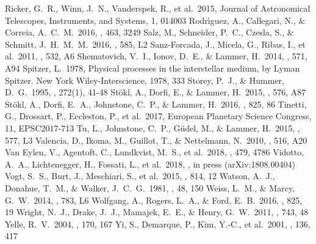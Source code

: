 \documentclass{aa}
\begin{document}
\begin{thebibliography}{}
    Ricker, G.~R., Winn, J.~N., Vanderspek, R., et al.\ 2015, Journal of Astronomical Telescopes, Instruments, and Systems, 1, 014003
    Rodr{\'{\i}}guez, A., Callegari, N., \& Correia, A.~C.~M.\ 2016, \mnras, 463, 3249
    Salz, M., Schneider, P.~C., Czesla, S., \& Schmitt, J.~H.~M.~M.\ 2016,          \aap, 585, L2
    Sanz-Forcada, J., Micela, G., Ribas, I., et al.\ 2011, \aap, 532, A6
    Shematovich, V.~I., Ionov, D.~E., \& Lammer, H.\ 2014, \aap, 571, A94
    Spitzer, L.\ 1978, Physical processes in the interstellar medium, by Lyman Spitzer. New York Wiley-Interscience, 1978, 333
     Storey, P.~J., \& Hummer, D.~G.\ 1995, \mnras, 272(1), 41-48
    St{\"o}kl, A., Dorfi, E., \& Lammer, H.\ 2015, \aap, 576, A87
    St{\"o}kl, A., Dorfi, E.~A., Johnstone, C.~P., \& Lammer, H.\ 2016, \apj, 825, 86
    Tinetti, G., Drossart, P., Eccleston, P., et al.\ 2017, European Planetary Science Congress, 11, EPSC2017-713
    Tu, L., Johnstone, C.~P., G{\"u}del, M., \& Lammer, H.\ 2015, \aap, 577, L3
    Valencia, D., Ikoma, M., Guillot, T., \& Nettelmann, N.\ 2010, \aap, 516, A20
    Van Eylen, V., Agentoft, C., Lundkvist, M.~S., et al.\ 2018, \mnras, 479, 4786
    Vidotto, A.~A., Lichtenegger, H., Fossati, L., et al.\ 2018, \mnras, in press (arXiv:1808.00404)
    Vogt, S.~S., Burt, J., Meschiari, S., et al.\ 2015, \apj, 814, 12
    Watson, A.~J., Donahue, T.~M., \& Walker, J.~C.~G.\ 1981, \icarus, 48,          150
    Weiss, L.~M., \& Marcy, G.~W.\ 2014, \apjl, 783, L6
    Wolfgang, A., Rogers, L.~A., \& Ford, E.~B.\ 2016, \apj, 825, 19
    Wright, N.~J., Drake, J.~J., Mamajek, E.~E., \& Henry, G.~W.\ 2011,             \apj, 743, 48
    Yelle, R.~V.\ 2004, \icarus, 170, 167
    Yi, S., Demarque, P., Kim, Y.-C., et al.\ 2001, \apjs, 136, 417
\end{thebibliography}
%
\end{document}
